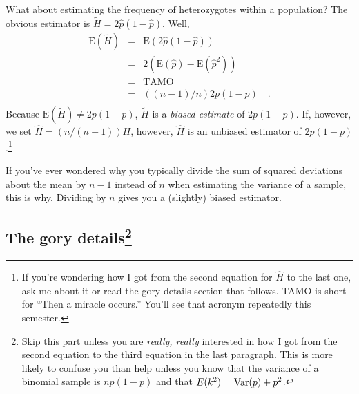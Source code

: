 What about estimating the frequency of heterozygotes within a
population? The obvious estimator is $\tilde H = 2\hat p (1 - \hat
p)$. Well,
\begin{eqnarray*}
\mbox{E}(\tilde H) &=& \mbox{E}\left(2\hat p (1 - \hat p)\right) \\
     &=& 2\left(\mbox{E}(\hat p) - \mbox{E}({\hat p}^2)\right) \\
     &=& \mbox{TAMO} \\
     &=& ((n-1)/n)2p(1-p) \quad . \\
\end{eqnarray*}
Because $\mbox{E}(\tilde H) \ne 2p(1-p)$, $\tilde H$ is a {\it biased
  estimate\/} of $2p(1-p)$. If, however, we set
$\hat H = (n/(n-1))\tilde H$, however, $\hat H$ is an unbiased
estimator of $2p(1-p)$.\footnote{If you're wondering how I got from
  the second equation for $\hat H$ to the last one, ask me about it or
  read the gory details section that follows. TAMO is short for ``Then
  a miracle occurs.'' You'll see that acronym repeatedly this
  semester.}

If you've ever wondered why you typically divide the sum of squared
deviations about the mean by $n-1$ instead of $n$ when estimating the
variance of a sample, this is why. Dividing by $n$ gives you a
(slightly) biased estimator.

\subsection*{The gory details\footnote{Skip this part unless
  you are {\it really, really\/} interested in how I got from the
second equation to the third equation in the last paragraph. This is
more likely to confuse you than help unless you know that the variance
of a binomial sample is $np(1-p)$ and that $E(k^2) = \hbox{Var}(p) +
p^2$.}}

